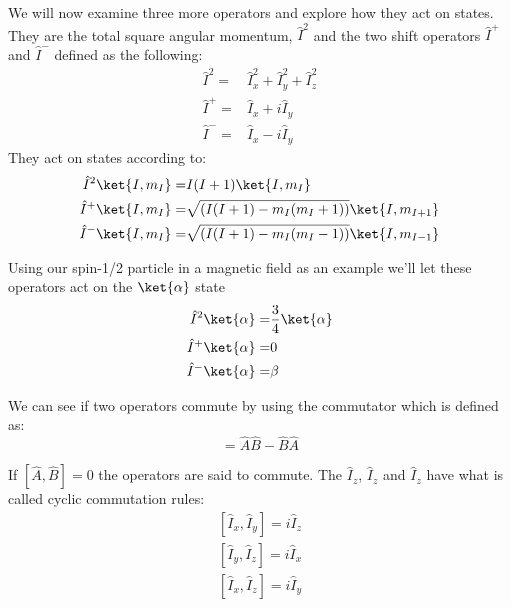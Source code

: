 We will now examine three more operators and explore how they act on states. They are the total square angular momentum, $\hat{I}^2$ and the two shift operators $\hat{I}^+$ and $\hat{I}^-$ defined as the following:
\begin{equation}
\begin{align}
  \hat{I}^2 =& \hat{I}_x^2 + \hat{I}_y^2 + \hat{I}_z^2\\
  \hat{I}^+ =& \hat{I}_x + i\hat{I}_y\\
  \hat{I}^- =& \hat{I}_x - i\hat{I}_y
\end{align}
\end{equation}
They act on states according to:
\begin{equation}
\begin{align}
  \hat{I}^2\ket{I,m_I} =& I(I+1)\ket{I, m_I}\\
  \hat{I}^+\ket{I,m_I} =& \sqrt{(I(I+1)-m_I(m_I+1))}\ket{I,m_{I+1}}\\
  \hat{I}^-\ket{I,m_I} =& \sqrt{(I(I+1)-m_I(m_I-1))}\ket{I,m_{I-1}}
\end{align}
\end{equation}

Using our spin-1/2 particle in a magnetic field as an example we'll let these operators act on the $\ket{\alpha}$ state
\begin{equation}
\begin{align}
  \hat{I}^2\ket{\alpha} =& \frac{3}{4}\ket{\alpha}\\
  \hat{I}^+\ket{\alpha} =& 0\\
  \hat{I}^-\ket{\alpha} =& {\beta}
\end{align}
\end{equation}

We can see if two operators commute by using the commutator which is defined as:
\begin{equation}
  [\hat{A},\hat{B}] = \hat{A}\hat{B} - \hat{B}\hat{A}
\end{equation}

If $[\hat{A},\hat{B}] = 0$ the operators are said to commute. The $\hat{I}_z$, $\hat{I}_z$ and $\hat{I}_z$
have what is called cyclic commutation rules:
\begin{equation}\label{eqn:commutator}
\begin{align}
  [\hat{I}_x,\hat{I}_y] = i\hat{I}_z\\
  [\hat{I}_y,\hat{I}_z] = i\hat{I}_x\\
  [\hat{I}_x,\hat{I}_z] = i\hat{I}_y
\end{align}
\end{equation}


